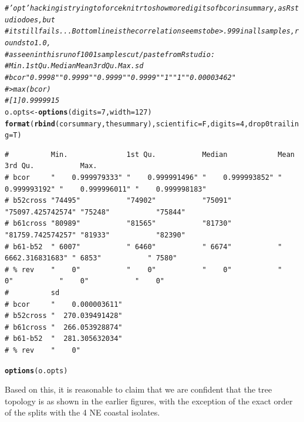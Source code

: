 \documentclass{article}\usepackage[]{graphicx}\usepackage[]{color}
\makeatletter
\newcommand{\hlnum}[1]{\textcolor[rgb]{0.686,0.059,0.569}{#1}}%
\newcommand{\hlcom}[1]{\textcolor[rgb]{0.678,0.584,0.686}{\textit{#1}}}%
\newcommand{\hlstd}[1]{\textcolor[rgb]{0.345,0.345,0.345}{#1}}%
\newcommand{\hlkwb}[1]{\textcolor[rgb]{0.69,0.353,0.396}{#1}}%
\newcommand{\hlkwc}[1]{\textcolor[rgb]{0.333,0.667,0.333}{#1}}%
\newcommand{\hlkwd}[1]{\textcolor[rgb]{0.737,0.353,0.396}{\textbf{#1}}}%
\newenvironment{kframe}{%
 \def\at@end@of@kframe{}%
 \ifinner\ifhmode%
  \def\at@end@of@kframe{\end{minipage}}%
  \begin{minipage}{\columnwidth}%
 \fi\fi%
 \def\FrameCommand##1{\hskip\@totalleftmargin \hskip-\fboxsep
 \colorbox{shadecolor}{##1}\hskip-\fboxsep
     \hskip-\linewidth \hskip-\@totalleftmargin \hskip\columnwidth}%
 \MakeFramed {\advance\hsize-\width
   \@totalleftmargin\z@ \linewidth\hsize
   \@setminipage}}%
 {\par\unskip\endMakeFramed%
 \at@end@of@kframe}
\newenvironment{knitrout}{}{} %
\makeatother
\begin{document}
\begin{knitrout}\footnotesize
{}\color{fgcolor}\begin{kframe}
\begin{alltt}
\hlcom{# 'opt' hacking is trying to force knitr to show more digits of bcor in summary, as Rstudio does, but}
\hlcom{# it still fails...  Bottom line is the correlation seems to be  > .999 in all samples, rounds to 1.0,}
\hlcom{# as seen in this run of 1001 samples cut/paste from Rstudio:}
\hlcom{#          Min.        1st Qu.     Median      Mean        3rd Qu. Max.   sd             }
\hlcom{# bcor     "   0.9998" "   0.9999" "   0.9999" "   0.9999" "   1"  "   1" "   0.00003462"}
\hlcom{# > max(bcor)}
\hlcom{# [1] 0.9999915}
\hlstd{o.opts} \hlkwb{<-} \hlkwd{options}\hlstd{(}\hlkwc{digits}\hlstd{=}\hlnum{7}\hlstd{,}\hlkwc{width}\hlstd{=}\hlnum{127}\hlstd{)}
\hlkwd{format}\hlstd{(}\hlkwd{rbind}\hlstd{(corsummary,thesummary),}\hlkwc{scientific}\hlstd{=F,}\hlkwc{digits}\hlstd{=}\hlnum{4}\hlstd{,}\hlkwc{drop0trailing}\hlstd{=T)}
\end{alltt}
\begin{verbatim}
#          Min.              1st Qu.           Median            Mean              3rd Qu.           Max.             
# bcor     "    0.999979333" "    0.999991496" "    0.999993852" "    0.999993192" "    0.999996011" "    0.999998183"
# b52cross "74495"           "74902"           "75091"           "75097.425742574" "75248"           "75844"          
# b61cross "80989"           "81565"           "81730"           "81759.742574257" "81933"           "82390"          
# b61-b52  " 6007"           " 6460"           " 6674"           " 6662.316831683" " 6853"           " 7580"          
# % rev    "    0"           "    0"           "    0"           "    0"           "    0"           "    0"          
#          sd               
# bcor     "    0.000003611"
# b52cross "  270.039491428"
# b61cross "  266.053928874"
# b61-b52  "  281.305632034"
# % rev    "    0"
\end{verbatim}
\begin{alltt}
\hlkwd{options}\hlstd{(o.opts)}
\end{alltt}
\end{kframe}
\end{knitrout}

Based on this, it is reasonable to claim that we are confident that the tree topology is as shown in the earlier
figures, with the exception of the exact order of the splits with the 4 NE coastal isolates.
\end{document}
